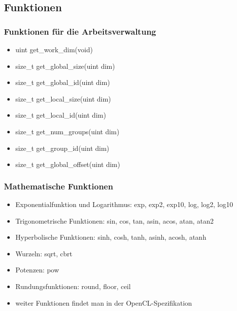 \documentclass{beamer}
\begin{document}
\subsection{Funktionen}
\begin{frame}[fragile]
\frametitle{Funktionen für die Arbeitsverwaltung}
\begin{itemize}
\item uint get\_work\_dim(void)
\item size\_t get\_global\_size(uint dim)
\item size\_t get\_global\_id(uint dim)
\item size\_t get\_local\_size(uint dim)
\item size\_t get\_local\_id(uint dim)
\item size\_t get\_num\_groups(uint dim)
\item size\_t get\_group\_id(uint dim)
\item size\_t get\_global\_offset(uint dim)
\end{itemize}
\end{frame}


\begin{frame}[fragile]
\frametitle{Mathematische Funktionen}
\begin{itemize}
\item Exponentialfunktion und Logarithmus: exp, exp2, exp10, log, log2, log10
\item Trigonometrische Funktionen: sin, cos, tan, asin, acos, atan, atan2
\item Hyperbolische Funktionen: sinh, cosh, tanh, asinh, acosh, atanh
\item Wurzeln: sqrt, cbrt
\item Potenzen: pow
\item Rundungsfunktionen: round, floor, ceil
\item weiter Funktionen findet man in der OpenCL-Spezifikation
\end{itemize}
\end{frame}
\end{document}
